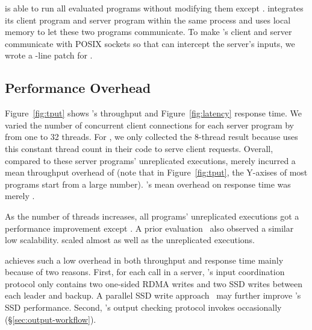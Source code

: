 \xxx is able to run all \nprog evaluated programs without modifying them except 
\calvin. \calvin integrates its client program and server program within the 
same process and uses local memory to let these two programs communicate. To 
make \calvin's client and server communicate with POSIX sockets so that \xxx 
can intercept the server's inputs, we wrote a \nlinescalvin-line patch for 
\calvin.

\subsection{Performance Overhead} \label{sec:overhead}

Figure~\ref{fig:tput} shows \xxx's throughput and Figure~\ref{fig:latency} 
response time. We varied the number of concurrent client connections for each 
server program by from one to 32 threads. For \calvin, we only collected the 
8-thread result because \calvin uses this constant thread count in their code 
to serve client requests. Overall, compared to these server programs' 
unreplicated executions, \xxx merely incurred a mean throughput overhead of 
\tputoverhead (note that in Figure~\ref{fig:tput}, the Y-axises of most programs 
start from a large number). \xxx's mean overhead on response time was merely 
\latencyoverhead.

As the number of threads increases, all programs' unreplicated executions 
got a performance improvement except \memcached. A prior 
evaluation~\cite{rex:eurosys14} also observed a similar \memcached low 
scalability. \xxx scaled almost as well as the unreplicated executions.

\xxx achieves such a low overhead in both throughput and response time mainly 
because of two reasons. First, for each \recv call in a server, \xxx's input 
coordination protocol only contains two one-sided RDMA writes and two SSD writes 
between each leader and backup. A parallel SSD write 
approach~\cite{Bessani:usenix13} may further improve \xxx's SSD performance.  
Second, \xxx's output checking protocol invokes occasionally 
(\S\ref{sec:output-workflow}).


